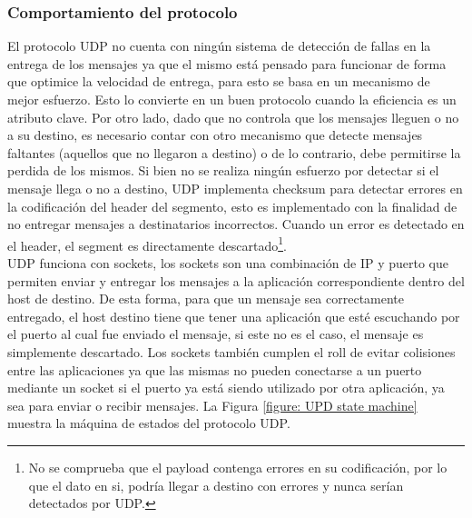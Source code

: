 \documentclass[10pt,a4paper]{article}
\begin{document}
\subsubsection{Comportamiento del protocolo}

El protocolo UDP no cuenta con ningún sistema de detección de fallas en la entrega de los mensajes ya que el mismo está pensado para funcionar de forma que optimice la velocidad de entrega, para esto se basa en un mecanismo de mejor esfuerzo. Esto lo convierte en un buen protocolo cuando la eficiencia es un atributo clave. Por otro lado, dado que no controla que los mensajes lleguen o no a su destino, es necesario contar con otro mecanismo que detecte mensajes faltantes (aquellos que no llegaron a destino) o de lo contrario, debe permitirse la perdida de los mismos. Si bien no se realiza ningún esfuerzo por detectar si el mensaje llega o no a destino, UDP implementa checksum para detectar errores en la codificación del header del segmento, esto es implementado con la finalidad de no entregar mensajes a destinatarios incorrectos. Cuando un error es detectado en el header, el segment es directamente descartado\footnote{No se comprueba que el payload contenga errores en su codificación, por lo que el dato en si, podría llegar a destino con errores y nunca serían detectados por UDP.}.\\

UDP funciona con sockets, los sockets son una combinación de IP y puerto que permiten enviar y entregar los mensajes a la aplicación correspondiente dentro del host de destino. De esta forma, para que un mensaje sea correctamente entregado, el host destino tiene que tener una aplicación que esté escuchando por el puerto al cual fue enviado el mensaje, si este no es el caso, el mensaje es simplemente descartado. Los sockets también cumplen el roll de evitar colisiones entre las aplicaciones ya que las mismas no pueden conectarse a un puerto mediante un socket si el puerto ya está siendo utilizado por otra aplicación, ya sea para enviar o recibir mensajes. La Figura \ref{figure: UPD state machine} muestra la máquina de estados del protocolo UDP. \\
\end{document}
